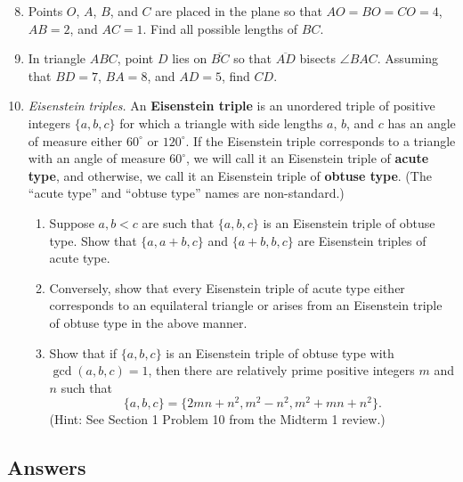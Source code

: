 \begin{enumerate}\setcounter{enumi}{7}
\item Points $O$, $A$, $B$, and $C$ are placed in the plane so that $AO = BO = CO = 4$, $AB = 2$, and $AC = 1$. Find all possible lengths of $BC$.
\item In triangle $ABC$, point $D$ lies on $\overline{BC}$ so that $\overline{AD}$ bisects $\angle BAC$. Assuming that $BD = 7$, $BA = 8$, and $AD = 5$, find $CD$.
\item \emph{Eisenstein triples.} An \textbf{Eisenstein triple} is an unordered triple of positive integers $\{a,b,c\}$ for which a triangle with side lengths $a$, $b$, and $c$ has an angle of measure either $60^{\circ}$ or $120^{\circ}$. If the Eisenstein triple corresponds to a triangle with an angle of measure $60^{\circ}$, we will call it an Eisenstein triple of \textbf{acute type}, and otherwise, we call it an Eisenstein triple of \textbf{obtuse type}. (The ``acute type'' and ``obtuse type'' names are non-standard.)
\begin{enumerate}
\item Suppose $a, b < c$ are such that $\{a,b,c\}$ is an Eisenstein triple of obtuse type. Show that $\{a, a + b, c\}$ and $\{a + b, b, c\}$ are Eisenstein triples of acute type.
\item Conversely, show that every Eisenstein triple of acute type either corresponds to an equilateral triangle or arises from an Eisenstein triple of obtuse type in the above manner.
\item Show that if $\{a,b,c\}$ is an Eisenstein triple of obtuse type with $\gcd(a,b,c) = 1$, then there are relatively prime positive integers $m$ and $n$ such that
\begin{equation*}
\{a,b,c\} = \{2mn + n^2, m^2 - n^2, m^2 + mn + n^2\}.
\end{equation*}
(Hint: See Section 1 Problem 10 from the Midterm 1 review.)
\end{enumerate}
\end{enumerate}


\newpage
\subsection{Answers}


